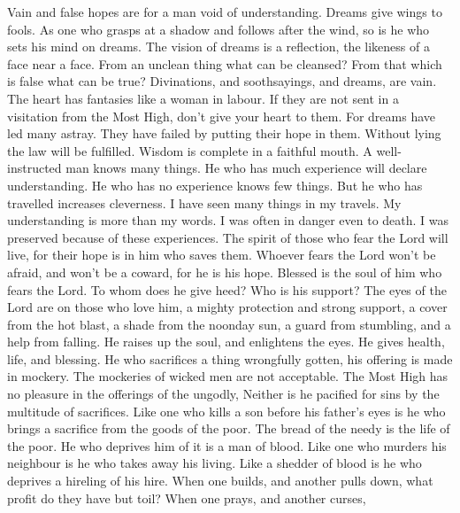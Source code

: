 Vain and false hopes are for a man void of understanding.
Dreams give wings to fools.  As one who grasps at a shadow
and follows after the wind, so is he who sets his mind on dreams.
 The vision of dreams is a reflection, the likeness of a
face near a face.  From an unclean thing what can be
cleansed? From that which is false what can be true? 
Divinations, and soothsayings, and dreams, are vain. The heart has
fantasies like a woman in labour.  If they are not sent in a
visitation from the Most High, don't give your heart to them.
 For dreams have led many astray. They have failed by
putting their hope in them.  Without lying the law will be
fulfilled. Wisdom is complete in a faithful mouth.  A
well-instructed man knows many things. He who has much experience will
declare understanding.  He who has no experience knows few
things. But he who has travelled increases cleverness.  I
have seen many things in my travels. My understanding is more than my
words.  I was often in danger even to death. I was
preserved because of these experiences.  The spirit of
those who fear the Lord will live, for their hope is in him who saves
them.  Whoever fears the Lord won't be afraid, and won't be
a coward, for he is his hope.  Blessed is the soul of him
who fears the Lord. To whom does he give heed? Who is his support?
 The eyes of the Lord are on those who love him, a mighty
protection and strong support, a cover from the hot blast, a shade from
the noonday sun, a guard from stumbling, and a help from falling.
 He raises up the soul, and enlightens the eyes. He gives
health, life, and blessing.  He who sacrifices a thing
wrongfully gotten, his offering is made in mockery. The mockeries of
wicked men are not acceptable.  The Most High has no
pleasure in the offerings of the ungodly, Neither is he pacified for
sins by the multitude of sacrifices.  Like one who kills a
son before his father's eyes is he who brings a sacrifice from the goods
of the poor.  The bread of the needy is the life of the
poor. He who deprives him of it is a man of blood.  Like
one who murders his neighbour is he who takes away his living. Like a
shedder of blood is he who deprives a hireling of his hire.
 When one builds, and another pulls down, what profit do
they have but toil?  When one prays, and another curses,
